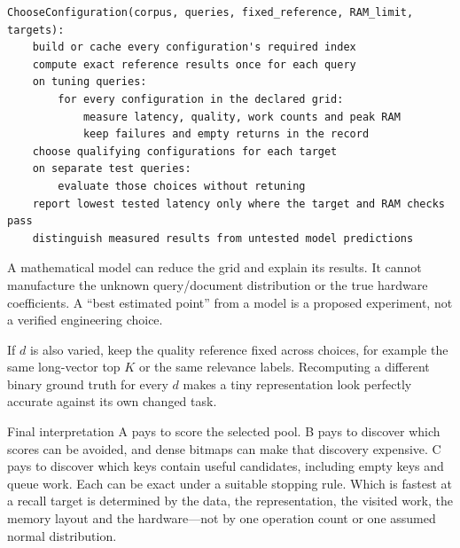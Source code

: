 \par\noindent\begin{minipage}{\linewidth}
\begin{lstlisting}[caption={A defensible finite-grid experiment.}]
ChooseConfiguration(corpus, queries, fixed_reference, RAM_limit, targets):
    build or cache every configuration's required index
    compute exact reference results once for each query
    on tuning queries:
        for every configuration in the declared grid:
            measure latency, quality, work counts and peak RAM
            keep failures and empty returns in the record
    choose qualifying configurations for each target
    on separate test queries:
        evaluate those choices without retuning
    report lowest tested latency only where the target and RAM checks pass
    distinguish measured results from untested model predictions
\end{lstlisting}
\end{minipage}\par

A mathematical model can reduce the grid and explain its results. It cannot manufacture the
unknown query/document distribution or the true hardware coefficients. A ``best estimated
point'' from a model is a proposed experiment, not a verified engineering choice.

If $d$ is also varied, keep the quality reference fixed across choices, for example the same
long-vector top $K$ or the same relevance labels. Recomputing a different binary ground truth
for every $d$ makes a tiny representation look perfectly accurate against its own changed task.

\begin{resultbox}{Final interpretation}
A pays to score the selected pool. B pays to discover which scores can be avoided, and dense
bitmaps can make that discovery expensive. C pays to discover which keys contain useful
candidates, including empty keys and queue work. Each can be exact under a suitable stopping
rule. Which is fastest at a recall target is determined by the data, the representation,
the visited work, the memory layout and the hardware---not by one operation count or one
assumed normal distribution.
\end{resultbox}
